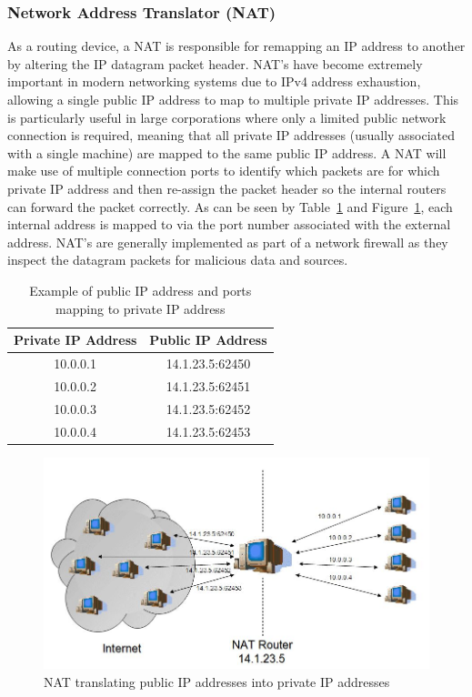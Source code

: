 \documentclass[interim_report.tex]{subfiles}
\begin{document}
\subsubsection{Network Address Translator (NAT)}
As a routing device, a NAT is responsible for remapping an IP address to another by altering the IP datagram packet header. NAT's have become extremely important in modern networking systems due to IPv4 address exhaustion, allowing a single public IP address to map to multiple private IP addresses. This is particularly useful in large corporations where only a limited public network connection is required, meaning that all private IP addresses (usually associated with a single machine) are mapped to the same public IP address. A NAT will make use of multiple connection ports to identify which packets are for which private IP address and then re-assign the packet header so the internal routers can forward the packet correctly. As can be seen by Table~\ref{tab:ip} and Figure~\ref{fig:nat}, each internal address is mapped to via the port number associated with the external address. NAT's are generally implemented as part of a network firewall as they inspect the datagram packets for malicious data and sources.

\begin{table}[H]
	\centering
	\begin{tabular} { | c | c | }
		\hline
		\textbf{Private IP Address} & \textbf{Public IP Address} \\
		\hline
		10.0.0.1 & 14.1.23.5:62450 \\
		\hline
		10.0.0.2 & 14.1.23.5:62451 \\
		\hline
		10.0.0.3 & 14.1.23.5:62452 \\
		\hline
		10.0.0.4 & 14.1.23.5:62453 \\
		\hline
	\end{tabular}
	\caption{Example of public IP address and ports mapping to private IP address}
	\label{tab:ip}
\end{table}

\begin{figure}[H]
	\centering
	\includegraphics[width=\textwidth]{img/nat.jpg}
	\caption{NAT translating public IP addresses into private IP addresses \cite{nat-table}}
	\label{fig:nat}
\end{figure}
\end{document}
